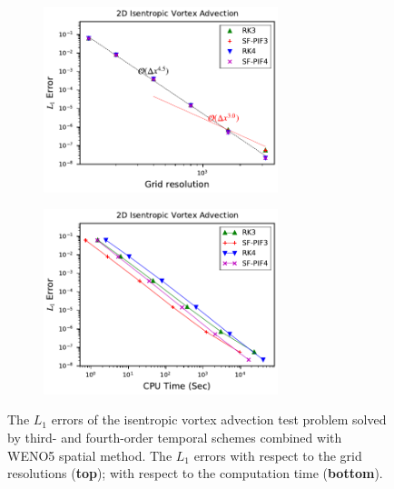 \begin{figure}
    \centering
    \begin{subfigure}{\textwidth}
        \centering
        \includegraphics[width=0.75\textwidth]{fig/weno5_vortex_error_fourth}
    \end{subfigure}
    \par\bigskip
    \begin{subfigure}{\textwidth}
        \centering
        \includegraphics[width=0.75\textwidth]{fig/weno5_vortex_time_fourth}
    \end{subfigure}
    \caption{The \( L_{1} \) errors of the isentropic vortex advection test problem
        solved by third- and fourth-order temporal schemes combined with WENO5 spatial method.
        The \( L_{1} \) errors
        with respect to the grid resolutions (\textbf{top});
        with respect to the computation time (\textbf{bottom}).
    }\label{fig:vortex_fourth}
\end{figure}

